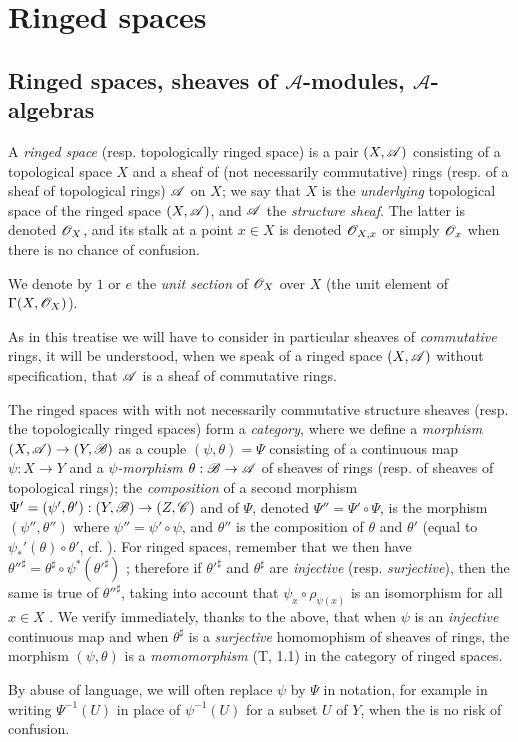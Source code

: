 \section{Ringed spaces}
\label{section-ringed-spaces}

\subsection{Ringed spaces, sheaves of $\mathcal{A}$-modules, $\mathcal{A}$-algebras}
\label{subsection-ringed-spaces-sheaves-of-modules-and-algebras}

\begin{env}[4.1.1]
\label{0.4.1.1}
A \emph{ringed space} (resp. topologically ringed space) is a pair $(X,\mathscr{A})$
consisting of a topological space $X$ and a sheaf of (not necessarily
commutative) rings (resp. of a sheaf of topological rings) $\mathscr{A}$ on $X$; we
say that $X$ is the \emph{underlying} topological space of the ringed space
$(X,\mathscr{A})$, and $\mathscr{A}$ the \emph{structure sheaf}. The latter is denoted
$\mathscr{O}_X$, and its stalk at a point $x\in X$ is denoted $\mathscr{O}_{X,x}$ or simply
$\mathscr{O}_x$ when there is no chance of confusion.

We denote by $1$ or $e$ the \emph{unit section} of $\mathscr{O}_X$ over $X$ (the unit
element of $\Gamma(X,\mathscr{O}_X)$).

As in this treatise we will have to consider in particular sheaves of
\emph{commutative} rings, it will be understood, when we speak of a ringed space
$(X,\mathscr{A})$ without specification, that $\mathscr{A}$ is a sheaf of commutative
rings.

The ringed spaces with with not necessarily commutative structure sheaves
(resp. the topologically ringed spaces) form a \emph{category}, where we define
a \emph{morphism} $(X,\mathscr{A})\to(Y,\mathscr{B})$ as a couple $(\psi,\theta)=\Psi$
consisting of a continuous map $\psi:X\to Y$ and a \emph{$\psi$-morphism}
$\theta:\mathscr{B}\to\mathscr{A}$  of sheaves of rings (resp. of sheaves
of topological rings); the \emph{composition} of a second morphism
$\Psi'=(\psi',\theta'):(Y,\mathscr{B})\to(Z,\mathscr{C})$ and of $\Psi$, denoted
$\Psi''=\Psi'\circ\Psi$, is the morphism $(\psi'',\theta'')$ where
$\psi''=\psi'\circ\psi$, and $\theta''$ is the composition of $\theta$ and
$\theta'$ (equal to $\psi_*'(\theta)\circ\theta'$, cf. ). For
ringed spaces, remember that we then have
${\theta''}^\sharp=\theta^\sharp\circ\psi^*({\theta'}^\sharp)$
; therefore if ${\theta'}^\sharp$ and $\theta^\sharp$ are
\emph{injective} (resp. \emph{surjective}), then the same is true of
${\theta''}^\sharp$, taking into account that $\psi_x\circ\rho_{\psi(x)}$ is an
isomorphism for all $x\in X$ . We verify immediately, thanks to
the above, that when $\psi$ is an \emph{injective} continuous map and when
$\theta^\sharp$ is a \emph{surjective} homomophism of sheaves of rings, the
morphism $(\psi,\theta)$ is a \emph{momomorphism} (T, 1.1) in the category of
ringed spaces.

By abuse of language, we will often replace $\psi$ by $\Psi$ in notation, for
example in writing $\Psi^{-1}(U)$ in place of $\psi^{-1}(U)$ for a subset $U$ of
$Y$, when the is no risk of confusion.
\end{env}

